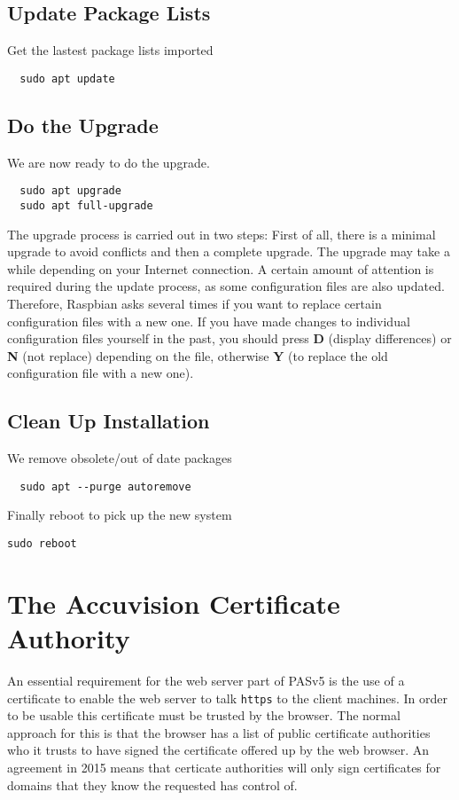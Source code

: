 \documentclass[Draft]{akc}
\begin{document}
\subsection{Update Package Lists}
Get the lastest package lists imported
\begin{lstlisting}
  sudo apt update
\end{lstlisting}

\subsection{Do the Upgrade}
We are now ready to do the upgrade.
\begin{lstlisting}
  sudo apt upgrade
  sudo apt full-upgrade
\end{lstlisting}

The upgrade process is carried out in two steps: First of all, there is a minimal upgrade to avoid
conflicts and then a complete upgrade. The upgrade may take a while depending on your Internet
connection. A certain amount of attention is required during the update process, as some
configuration files are also updated. Therefore, Raspbian asks several times if you want to replace
certain configuration files with a new one. If you have made changes to individual configuration
files yourself in the past, you should press \textbf{D} (display differences) or \textbf{N} (not replace) depending on
the file, otherwise \textbf{Y} (to replace the old configuration file with a new one).

\subsection{Clean Up Installation}

We remove obsolete/out of date packages
\begin{lstlisting}
  sudo apt --purge autoremove
\end{lstlisting}
Finally reboot to pick up the new system
\begin{lstlisting}
sudo reboot
\end{lstlisting}
\section {The Accuvision Certificate Authority}

An essential requirement for the web server part of PASv5 is the use of a certificate to enable the web server to talk \texttt{https} to
the client machines.  In order to be usable this certificate must be trusted by the browser.  The normal approach for this is that the browser
has a list of public certificate authorities who it trusts to have signed the certificate offered up by the web browser.  An agreement in 2015
means that certicate authorities will only sign certificates for domains that they know the requested has control of.
\end{document}
